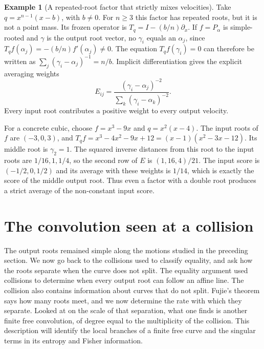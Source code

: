 \documentclass[12pt,reqno]{amsart}
\theoremstyle{definition}
\newtheorem{example}[example]{Example}
\theoremstyle{remark}
\begin{document}
\begin{example}[A repeated-root factor that strictly mixes velocities]
\label{ex:strict-transport-repeated-factor}
Take \(q=x^{n-1}(x-b)\), with \(b\ne0\).  For \(n\geq3\) this factor
has repeated roots, but it is not a point mass.  Its frozen operator is
\(T_q=I-(b/n)\partial_x\).  If \(f=P_\alpha\) is simple-rooted and
\(\gamma\) is the output root vector, no \(\gamma_i\) equals an
\(\alpha_j\), since \(T_qf(\alpha_j)=-(b/n)f'(\alpha_j)\ne0\).
The equation \(T_qf(\gamma_i)=0\) can therefore be written as
\(\sum_j(\gamma_i-\alpha_j)^{-1}=n/b\).  Implicit differentiation gives
the explicit averaging weights
\begin{equation}\label{eq:repeated-factor-jacobian}
 E_{ij}=
 \frac{(\gamma_i-\alpha_j)^{-2}}
      {\sum_k(\gamma_i-\alpha_k)^{-2}}.
\end{equation}
Every input root contributes a positive weight to every output velocity.

For a concrete cubic, choose \(f=x^3-9x\) and \(q=x^2(x-4)\). The input roots of \(f\) are \((-3,0,3)\), and \(T_qf=x^3-4x^2-9x+12=(x-1)(x^2-3x-12)\). Its middle root is \(\gamma_2=1\). The squared inverse distances from this root to the input roots are \(1/16,1,1/4\), so the second row of
\(E\) is \((1,16,4)/21\). The input score is \((-1/2,0,1/2)\) and its average with these weights is \(1/14\), which is exactly the score of the middle output root. Thus even a factor with a double root produces a strict average of the non-constant input score.
\end{example}

\section{The convolution seen at a collision}
\label{sec:collision-local}
The output roots remained simple along the motions studied in the preceding section. We now go back to the collisions used to classify equality, and ask how the roots separate when the curve does not split.
The equality argument used collisions to determine when every output root
can follow an affine line. The collision also contains information about
curves that do not split. Fujie's theorem says how many roots meet, and we now determine the rate with which they separate. Looked at on the scale of that separation, what one finds is another finite free convolution, of degree equal to the multiplicity of the collision. This description will identify the local branches of a finite free curve and the singular terms in its entropy and Fisher information.
\end{document}
